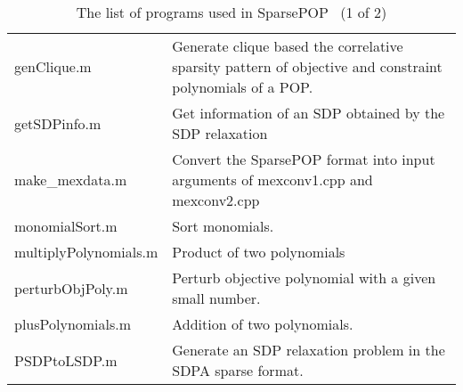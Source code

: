 \begin{table}
\begin{tabular}{|l|p{10cm}|}
genClique.m  & Generate {\sf clique} based the correlative sparsity pattern of objective and constraint polynomials of a POP.\\
getSDPinfo.m & Get information of an SDP obtained by the SDP relaxation\\
make\_mexdata.m & Convert the SparsePOP format into input arguments of mexconv1.cpp and mexconv2.cpp\\
monomialSort.m & Sort monomials. \\ 
multiplyPolynomials.m & Product of two polynomials\\
perturbObjPoly.m & Perturb objective polynomial with a given small number. \\
plusPolynomials.m  & Addition of two polynomials. \\ 
PSDPtoLSDP.m & Generate an SDP relaxation problem in the SDPA  sparse format. \\ 
\hline
\end{tabular}
\label{prog1}
\caption{The list of programs used in SparsePOP  \ (1 of 2)}
\end{table}

